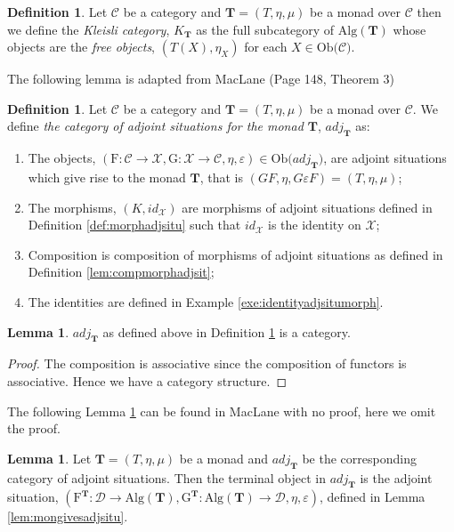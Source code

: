 \documentclass[11pt,a4paper]{article}
\theoremstyle{definition}
\newtheorem{lemma}[thm]{Lemma}
\newtheorem{definition}[thm]{Definition}
\newcommand\ob[1]{\mathrm{Ob(}#1\mathrm{)}}
\newcommand\cat[1]{\mathscr{#1}}
\newcommand\func[3]{\mathrm{#1}\colon#2\rightarrow#3}
\newcommand{\alg}[1]{\mathrm{Alg}(\mathbf{#1})}
\numberwithin{equation}{section}
\begin{document}
\begin{definition}
    \label{def:kleislicategory}
    Let $\cat{C}$ be a category and $\mathbf{T} = (T,\eta,\mu)$ be a monad over $\cat{C}$ then we define the \emph{Kleisli category}, $K_{\mathbf{T}}$ as the full subcategory of $\alg{T}$ whose objects are the \emph{free objects}, $(T(X),\eta_{X})$ for each $X\in\ob{\cat{C}}$.
\end{definition}
The following lemma is adapted from MacLane \cite{MacLane} (Page 148, Theorem 3)
\begin{definition}
    \label{def:catofadjsituofmon}
    Let $\cat{C}$ be a category and $\mathbf{T}= (T,\eta,\mu)$ be a monad over $\cat{C}$. We define \emph{the category of adjoint situations for the monad $\mathbf{T}$}, $adj_{\mathbf{T}}$ as:
    \begin{enumerate}
        \item The objects, $(\func{F}{\cat{C}}{\cat{X}},\func{G}{\cat{X}}{\cat{C}},\eta,\varepsilon)\in\ob{adj_{\mathbf{T}}}$, are adjoint situations which give rise to the monad $\mathbf{T}$, that is $(GF,\eta,G\varepsilon F)=(T,\eta,\mu)$;
        \item The morphisms, $(K,id_{\cat{X}})$ are morphisms of adjoint situations defined in Definition \ref{def:morphadjsitu} such that $id_{\cat{X}}$ is the identity on $\cat{X}$;
        \item Composition is composition of morphisms of adjoint situations as defined in Definition \ref{lem:compmorphadjsit};
        \item The identities are defined in Example \ref{exe:identityadjsitumorph}.
    \end{enumerate}
\end{definition}
\begin{lemma}
    $adj_{\mathbf{T}}$ as defined above in Definition \ref{def:catofadjsituofmon} is a category.
\end{lemma}
\begin{proof}
    The composition is associative since the composition of functors is associative. Hence we have a category structure.
\end{proof}
The following Lemma \ref{lem:termobajdcatiskli} can be found in MacLane \cite{MacLane} with no proof, here we omit the proof.
\begin{lemma}
    \label{lem:termobajdcatiskli}
    Let $\mathbf{T}=(T,\eta,\mu)$ be a monad and $adj_{\mathbf{T}}$ be the corresponding category of adjoint situations. Then the terminal object in $adj_{\mathbf{T}}$ is the adjoint situation, $(\func{F^{\mathbf{T}}}{\cat{D}}{\alg{T}},\func{G^{\mathbf{T}}}{\alg{T}}{\cat{D}},\eta,\varepsilon)$, defined in Lemma \ref{lem:mongivesadjsitu}.
\end{lemma}
\end{document}
